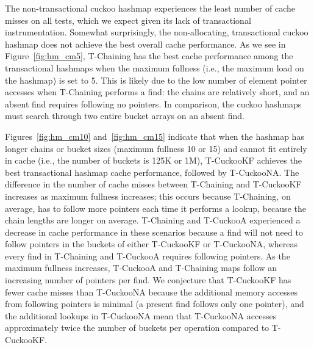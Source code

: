 The non-transactional cuckoo hashmap experiences the least number of cache misses on all tests, which we expect given its lack of transactional instrumentation. Somewhat surprisingly, the non-allocating, transactional cuckoo hashmap does not achieve the best overall cache performance. 
As we see in Figure~\ref{fig:hm_cm5}, T-Chaining has the best cache performance among the transactional hashmaps when the maximum fullness (i.e., the maximum load on the hashmap) is set to 5. This is likely due to the low number of element pointer accesses when T-Chaining performs a find: the chains are relatively short, and an absent find requires following no pointers. 
In comparison, the cuckoo hashmaps must search through two entire bucket arrays on an absent find. 

Figures~\ref{fig:hm_cm10} and~\ref{fig:hm_cm15} indicate that when the hashmap has longer chains or bucket sizes (maximum fullness 10 or 15) and cannot fit entirely in cache (i.e., the number of buckets is 125K or 1M), T-CuckooKF achieves the best transactional hashmap cache performance, followed by T-CuckooNA. 
The difference in the number of cache misses between T-Chaining and T-CuckooKF increases as maximum fullness increases; this occurs because T-Chaining, on average, has to follow more pointers each time it performs a lookup, because the chain lengths are longer on average.
T-Chaining and T-CuckooA experienced a decrease in cache performance in these scenarios because a find will not need to follow pointers in the buckets of either T-CuckooKF or T-CuckooNA, whereas every find in T-Chaining and T-CuckooA requires following pointers. As the maximum fullness increases, T-CuckooA and T-Chaining maps follow an increasing number of pointers per find.
We conjecture that T-CuckooKF has fewer cache misses than T-CuckooNA because the additional memory accesses from following pointers is minimal (a present find follows only one pointer), and the additional lookups in T-CuckooNA mean that T-CuckooNA accesses approximately twice the number of buckets per operation compared to T-CuckooKF.

\vspace{12pt}
\noindent{}

